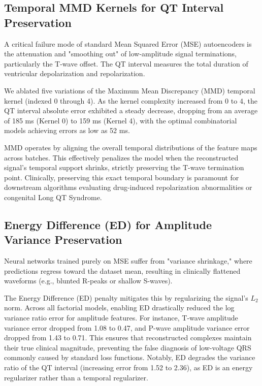 \subsection{Temporal MMD Kernels for QT Interval Preservation}
A critical failure mode of standard Mean Squared Error (MSE) autoencoders is the attenuation and "smoothing out" of low-amplitude signal terminations, particularly the T-wave offset. The QT interval measures the total duration of ventricular depolarization and repolarization. 

We ablated five variations of the Maximum Mean Discrepancy (MMD) temporal kernel (indexed 0 through 4). As the kernel complexity increased from 0 to 4, the QT interval absolute error exhibited a steady decrease, dropping from an average of 185 ms (Kernel 0) to 159 ms (Kernel 4), with the optimal combinatorial models achieving errors as low as 52 ms. 

MMD operates by aligning the overall temporal distributions of the feature maps across batches. This effectively penalizes the model when the reconstructed signal's temporal support shrinks, strictly preserving the T-wave termination point. Clinically, preserving this exact temporal boundary is paramount for downstream algorithms evaluating drug-induced repolarization abnormalities or congenital Long QT Syndrome.

\subsection{Energy Difference (ED) for Amplitude Variance Preservation}
Neural networks trained purely on MSE suffer from "variance shrinkage," where predictions regress toward the dataset mean, resulting in clinically flattened waveforms (e.g., blunted R-peaks or shallow S-waves). 

The Energy Difference (ED) penalty mitigates this by regularizing the signal's $L_2$ norm. Across all factorial models, enabling ED drastically reduced the log variance ratio error for amplitude features. For instance, T-wave amplitude variance error dropped from 1.08 to 0.47, and P-wave amplitude variance error dropped from 1.43 to 0.71. This ensures that reconstructed complexes maintain their true clinical magnitude, preventing the false diagnosis of low-voltage QRS commonly caused by standard loss functions. Notably, ED degrades the variance ratio of the QT interval (increasing error from 1.52 to 2.36), as ED is an energy regularizer rather than a temporal regularizer.

